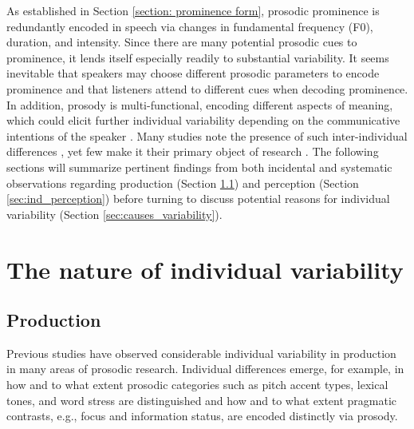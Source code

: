 As established in Section \ref{section: prominence form}, prosodic prominence is redundantly encoded in speech via changes in fundamental frequency (F0), duration, and intensity. Since there are many potential prosodic cues to prominence, it lends itself especially readily to substantial variability. It seems inevitable that speakers may choose different prosodic parameters to encode prominence and that listeners attend to different cues when decoding prominence. In addition, prosody is multi-functional, encoding different aspects of meaning, which could elicit further individual variability depending on the communicative intentions of the speaker \citep{coleProsodyContextReview2015}. Many studies note the presence of such inter-individual differences \citep{baumannTonalArticulatoryMarking2007, griceTonalAssociationDerived2009, muckeEffectFocusMarking2014, griceIntegratingDiscretenessContinuity2017, roessigDynamicsIntonationCategorical2019}, yet few make it their primary object of research \citep{moProsodyProductionPerception2010, cangemiListenerSpecificPerceptionSpeakerSpecific2015, ouyangIndividualDifferencesProsodic2015}. The following sections will summarize pertinent findings from both incidental and systematic observations regarding production (Section \ref{sec:ind_production}) and perception (Section \ref{sec:ind_perception}) before turning to discuss potential reasons for individual variability (Section \ref{sec:causes_variability}).

\section{The nature of individual variability}

\subsection{Production} \label{sec:ind_production}

Previous studies have observed considerable individual variability in production in many areas of prosodic research. Individual differences emerge, for example, in how and to what extent prosodic categories such as pitch accent types, lexical tones, and word stress are distinguished and how and to what extent pragmatic contrasts, e.g., focus and information status, are encoded distinctly via prosody.

